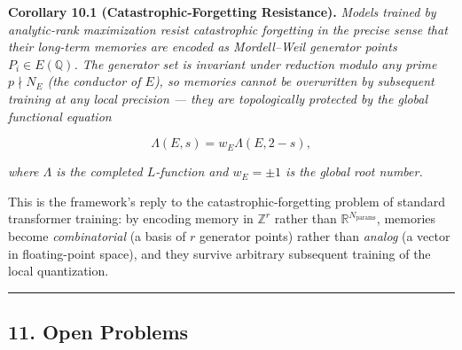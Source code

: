 \documentclass[
  11pt,
]{article}
\begin{document}
\textbf{Corollary 10.1 (Catastrophic-Forgetting Resistance).}
\emph{Models trained by analytic-rank maximization resist catastrophic
forgetting in the precise sense that their long-term memories are
encoded as Mordell--Weil generator points \(P_i \in E(\mathbb{Q})\). The
generator set is invariant under reduction modulo any prime
\(p \nmid N_E\) (the conductor of \(E\)), so memories cannot be
overwritten by subsequent training at any local precision --- they are
topologically protected by the global functional equation}

\[\Lambda(E, s) = w_E \Lambda(E, 2 - s),\]

\emph{where \(\Lambda\) is the completed \(L\)-function and
\(w_E = \pm 1\) is the global root number.}

This is the framework's reply to the catastrophic-forgetting problem of
standard transformer training: by encoding memory in \(\mathbb{Z}^r\)
rather than \(\mathbb{R}^{N_{\text{params}}}\), memories become
\emph{combinatorial} (a basis of \(r\) generator points) rather than
\emph{analog} (a vector in floating-point space), and they survive
arbitrary subsequent training of the local quantization.

\begin{center}\rule{0.5\linewidth}{0.5pt}\end{center}

\hypertarget{open-problems}{%
\subsection{11. Open Problems}\label{open-problems}}
\end{document}
